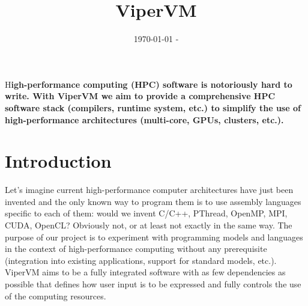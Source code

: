\documentclass[DIV=calc, paper=a4, fontsize=11pt, twocolumn]{scrartcl}	 %
\title{ViperVM} %
\date{\today{} - \currenttime}
\newcommand{\initial}[1]{ %
\lettrine[lines=3,lhang=0.3,nindent=0em]{
\color{DarkGoldenrod}
{\textsf{#1}}}{}}
\begin{document}
\maketitle %

\thispagestyle{fancy} %


\initial{H}\textbf{igh-performance computing (HPC) software is notoriously hard to
write. With ViperVM we aim to provide a comprehensive HPC software stack
(compilers, runtime system, etc.) to simplify the use of high-performance
architectures (multi-core, GPUs, clusters, etc.).
}


\section{Introduction}

Let's imagine current high-performance computer architectures have just been
invented and the only known way to program them is to use assembly languages
specific to each of them: would we invent C/C++, PThread, OpenMP, MPI, CUDA,
OpenCL? Obviously not, or at least not exactly in the same way. The purpose of
our project is to experiment with programming models and languages in the
context of high-performance computing without any prerequisite (integration into
existing applications, support for standard models, etc.). ViperVM aims to be a
fully integrated software with as few dependencies as possible that defines how
user input is to be expressed and fully controls the use of the computing
resources.
\end{document}
